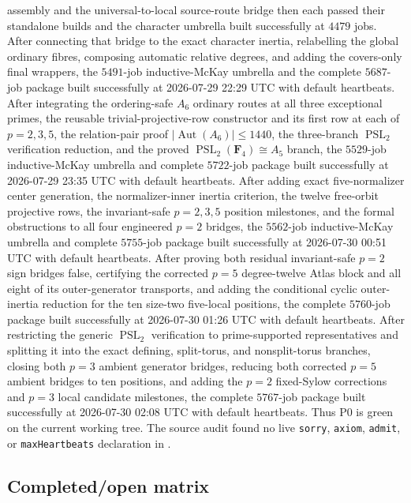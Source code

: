 \documentclass[11pt]{article}
\begin{document}
assembly and the universal-to-local source-route bridge then each passed
their standalone builds and the character umbrella built successfully at
\(4479\) jobs.  After connecting that bridge to the exact character
inertia, relabelling the global ordinary fibres, composing automatic
relative degrees, and adding the covers-only final wrappers, the
\(5491\)-job inductive-McKay umbrella and the complete \(5687\)-job package
built successfully at 2026-07-29 22:29 UTC with default heartbeats.
After integrating the ordering-safe \(A_6\) ordinary routes at all three
exceptional primes, the reusable trivial-projective-row constructor and
its first row at each of \(p=2,3,5\), the relation-pair proof
\(\lvert\operatorname{Aut}(A_6)\rvert\leq 1440\), the three-branch
\(\operatorname{PSL}_2\) verification reduction, and the proved
\(\operatorname{PSL}_2(\mathbf F_4)\cong A_5\) branch, the
\(5529\)-job inductive-McKay umbrella and complete \(5722\)-job package
built successfully at 2026-07-29 23:35 UTC with default heartbeats.
After adding exact five-normalizer center generation, the
normalizer-inner inertia criterion, the twelve free-orbit projective rows,
the invariant-safe \(p=2,3,5\) position milestones, and the formal
obstructions to all four engineered \(p=2\) bridges, the
\(5562\)-job inductive-McKay umbrella and complete \(5755\)-job package
built successfully at 2026-07-30 00:51 UTC with default heartbeats.
After proving both residual invariant-safe \(p=2\) sign bridges false,
certifying the corrected \(p=5\) degree-twelve Atlas block and all eight of
its outer-generator transports, and adding the conditional cyclic
outer-inertia reduction for the ten size-two five-local positions, the
complete \(5760\)-job package built successfully at 2026-07-30 01:26 UTC
with default heartbeats.
After restricting the generic \(\operatorname{PSL}_2\) verification to
prime-supported representatives and splitting it into the exact defining,
split-torus, and nonsplit-torus branches, closing both \(p=3\) ambient
generator bridges, reducing both corrected \(p=5\) ambient bridges to ten
positions, and adding the \(p=2\) fixed-Sylow corrections and \(p=3\) local
candidate milestones, the complete \(5767\)-job package built successfully
at 2026-07-30 02:08 UTC with default heartbeats.
Thus P0 is green on the current working tree.  The
source audit found no live \texttt{sorry},
\texttt{axiom}, \texttt{admit}, or \texttt{maxHeartbeats} declaration in
.

\subsection{Completed/open matrix}
\end{document}
